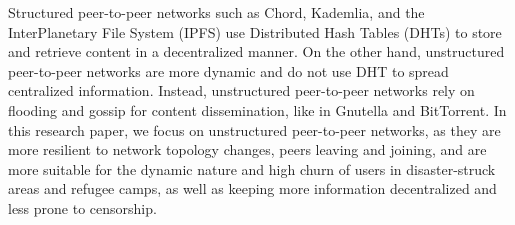 Structured peer-to-peer networks such as Chord, Kademlia, and the InterPlanetary File System (IPFS) use Distributed Hash Tables (DHTs) to store and retrieve content in a decentralized manner. 
On the other hand, unstructured peer-to-peer networks are more dynamic and do not use DHT to spread centralized information. Instead, unstructured peer-to-peer networks rely on flooding and gossip for content dissemination, like in Gnutella and BitTorrent.
In this research paper, we focus on unstructured peer-to-peer networks, as they are more resilient to network topology changes, peers leaving and joining, and are more suitable for the dynamic nature and high churn of users in disaster-struck areas and refugee camps, as well as keeping more information decentralized and less prone to censorship.